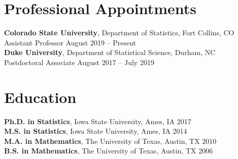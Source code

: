 \documentclass[margin,line]{res}
\newenvironment{list1}{
  \begin{list}{\ding{113}}{%
      \setlength{\itemsep}{0in}
      \setlength{\parsep}{0in} \setlength{\parskip}{0in}
      \setlength{\topsep}{0in} \setlength{\partopsep}{0in}
      \setlength{\leftmargin}{0.17in}}}{\end{list}}
\newenvironment{list2}{
  \begin{list}{$\bullet$}{%
      \setlength{\itemsep}{0in}
      \setlength{\parsep}{0in} \setlength{\parskip}{0in}
      \setlength{\topsep}{0in} \setlength{\partopsep}{0in}
      \setlength{\leftmargin}{0.2in}}}{\end{list}}
\begin{document}
\begin{resume}
% 
% 

\section{\sc Professional Appointments}
{\bf Colorado State University}, Department of Statistics, Fort Collins, CO\\
Assistant Professor \hfill August 2019 -- Present \\


\vspace{-.5cm}
{\bf Duke University}, Department of Statistical Science, Durham, NC\\
Postdoctoral Associate  \hfill August 2017 -- July 2019


\section{\sc Education}
{\bf Ph.D. in Statistics}, Iowa State University, Ames, IA \hfill 2017 \\
{\bf M.S. in Statistics}, Iowa State University, Ames, IA \hfill 2014 \\
{\bf M.A. in Mathematics}, The University of Texas, Austin, TX \hfill 2010 \\
{\bf B.S. in Mathematics}, The University of Texas, Austin, TX \hfill 2006 


\end{resume}
\end{document}
